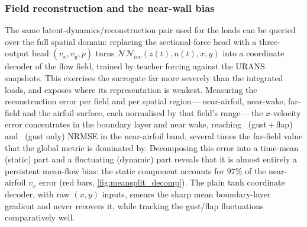 
\subsubsection{Field reconstruction and the near-wall bias}
\label{sssec:field_recon}

The same latent-dynamics/reconstruction pair used for the loads can be queried over
the full spatial domain: replacing the sectional-force head with a three-output head
$(v_x,v_y,p)$ turns $\mathcal{NN}_\mathrm{rec}(z(t),u(t),x,y)$ into a coordinate
decoder of the flow field, trained by teacher forcing against the URANS snapshots.
This exercises the surrogate far more severely than the integrated loads, and exposes
where its representation is weakest. Measuring the reconstruction error per field and
per spatial region\,---\,near-airfoil, near-wake, far-field and the airfoil surface,
each normalised by that field's range\,---\,the $x$-velocity error concentrates in the
boundary layer and near wake, reaching \msCcBaseNear\ (gust\,+\,flap) and \msABaseNear\
(gust only) NRMSE in the near-airfoil band, several times the far-field value that the
global metric is dominated by. Decomposing this error into a time-mean (static) part
and a fluctuating (dynamic) part reveals that it is almost entirely a persistent
mean-flow bias: the static component accounts for $97\%$ of the near-airfoil $v_x$
error (red bars, \cref{fig:meansplit_decomp}). The plain tanh coordinate decoder,
with raw $(x,y)$ inputs, smears the sharp mean boundary-layer gradient and never
recovers it, while tracking the gust/flap fluctuations comparatively well.

